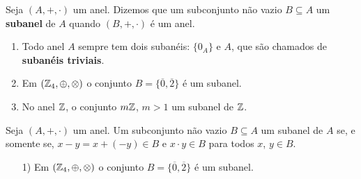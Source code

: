\documentclass{beamer}
\begin{document}
    \begin{frame}
        \begin{definicao}
            Seja $(A, +, \cdot)$ um anel. \pause Dizemos que um subconjunto n{\~a}o vazio \pause $B\subseteq A$  um \textbf{subanel} de $A$ \pause quando $(B, +, \cdot)$ \'e um anel.\pause
        \end{definicao}

        \begin{exemplos}
            \begin{enumerate}[label={\arabic*})]
                \item Todo anel $A$ sempre tem dois suban{\'e}is: \pause $\{0_{A}\}$ \pause e $A$, \pause que s{\~a}o chamados de \textbf{suban{\'e}is triviais}.\pause

                \vspace{.5cm}

                \item Em $(\mathbb{Z}_4,\oplus,\otimes)$ \pause o conjunto $B = \{\overline{0}, \overline{2}\}$ \'e um subanel.\pause

                \vspace{.5cm}

                \item No anel $\mathbb{Z}$, \pause o conjunto $m\mathbb{Z}$, $m > 1$  um subanel de $\mathbb{Z}$.\pause

                \vspace{.5cm}
            \end{enumerate}
        \end{exemplos}
    \end{frame}

    \begin{frame}
        \begin{proposicao}
            Seja $(A, +,\cdot)$ um anel. \pause Um subconjunto n{\~a}o vazio \pause $B\subseteq A$  um subanel de $A$ \pause se, e somente se, \pause $x - y = x + (-y) \in B$ \pause e $x\cdot y \in B$ \pause para todos $x$, $y \in B$.\pause
        \end{proposicao}
    \end{frame}

    \begin{frame}
        \begin{exemplos}
            \begin{enumerate}
                \item[1)] Em $(\mathbb{Z}_4,\oplus,\otimes)$ \pause o conjunto $B = \{\overline{0}, \overline{2}\}$ \'e um subanel.\pause

                \vspace{5cm}
            \end{enumerate}
        \end{exemplos}
    \end{frame}
\end{document}
